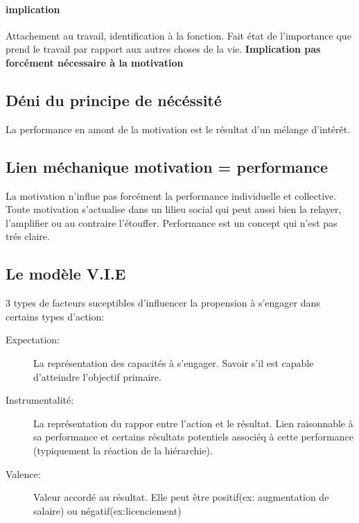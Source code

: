 \documentclass[11pt]{article} %
\begin{document}
		\paragraph{implication} Attachement au travail, identification à la fonction. Fait état de l'importance
		que prend le travail par rapport aux autres choses de la vie. \textbf{Implication pas forcément nécessaire à la motivation}
	\subsection{Déni du principe de nécéssité}
		La performance en amont de la motivation est le résultat d'un mélange d'intérêt.
	\subsection{Lien méchanique motivation = performance}
		La motivation n'influe pas forcément la performance individuelle et collective. Toute motivation 
		s'actualise dans un lilieu social qui peut aussi bien la relayer, l'amplifier ou au contraire l'étouffer. 
		Performance est un concept qui n'est pas trés claire.
	\subsection{Le modèle V.I.E}
		3 types de facteurs suceptibles d'influencer la propension à s'engager dans certains types d'action:
		\begin{description}
			\item[Expectation: ] La représentation des capacités à s'engager. Savoir s'il est capable d'atteindre 
			l'objectif primaire. 
			\item[Instrumentalité: ] La représentation du rappor entre l'action et le résultat. Lien raisonnable 
			à sa performance et certains résultats potentiels associéq à cette performance (typiquement la 
			réaction de la hiérarchie).
			\item[Valence: ] Valeur accordé au résultat. Elle peut être positif(ex: augmentation de salaire) ou
			négatif(ex:licenciement)
		\end{description}
\end{document}
